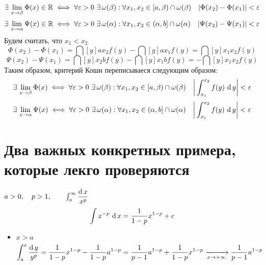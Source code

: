 \begin{statement}
    $$ \exist \liml{x \to \beta} \Phi(x) \in \R \iff \forall \veps > 0 ~ \exist \omega(\beta) : \forall x_1, x_2 \in [a, \beta) \cap \omega(\beta) \quad | \Phi(x_2) - \Phi(x_1) | < \veps $$
    $$ \exist \liml{x \to \alpha} \Psi(x) \in \R \iff \forall \veps > 0 ~ \exist \omega(\alpha) : \forall x_1, x_2 \in (\alpha, b] \cap \omega(\alpha) \quad | \Psi(x_2) - \Psi(x_1) | < \veps $$
    Будем считать, что $ x_1 < x_2 $
    $$ \Phi(x_2) - \Phi(x_1) = \dint[y]a{x_2}{f(y)} - \dint[y]a{x_1}{f(y)} = \dint[y]{x_1}{x_2}{f(y)} $$
    $$ \Psi(x_2) - \Psi(x_1) = \dint[y]{x_2}b{f(y)} - \dint[y]{x_1}b{f(y)} = -\dint[y]{x_1}{x_2}{f(y)} $$
    Таким образом, критерий Коши переписываеся следующим образом:
    $$ \exist \liml{x \to \beta} \Phi(x) \iff \forall \veps > 0 ~ \exist \omega(\beta) : \forall x_1, x_2 \in [a, \beta) \cap \omega(\beta) \quad \bigg| \dint[y]{x_1}{x_2}{f(y)} \bigg| < \veps $$
    $$ \exist \liml{x \to \alpha} \Psi(x) \iff \forall \veps > 0 ~ \exist \omega(\alpha) : \forall x_1, x_2 \in (\alpha, b] \cap \omega(\alpha) \quad \bigg| \dint[y]{x_1}{x_2}{f(y)} \bigg| < \veps $$
\end{statement}

\section{Два важных конкретных примера, которые лекго проверяются}

\begin{eg}
    $ a > 0, \quad p > 1, \qquad \dfint{a}\infty{x^p} $
    $$ \uint{x^{-p}} = \frac1{1 - p}x^{1 - p} + c $$
    \begin{itemize}
    	\item $ x > a $
        $$ \dfint[y]ax{y^p} = \frac1{1 - p}x^{1 - p} - \frac1{1 - p}a^{1 - p} = \frac1{p - 1}a^{1 - p} + \frac1{1 - p}x^{1 - p} \underarr{x \to +\infty} \frac1{p - 1}a^{1 - p} $$
    \end{itemize}
\end{eg}
